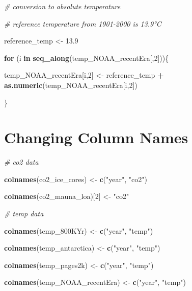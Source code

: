 \documentclass[
]{article}
\newenvironment{Shaded}{\begin{snugshade}}{\end{snugshade}}
\newcommand{\CommentTok}[1]{\textcolor[rgb]{0.56,0.35,0.01}{\textit{#1}}}
\newcommand{\ControlFlowTok}[1]{\textcolor[rgb]{0.13,0.29,0.53}{\textbf{#1}}}
\newcommand{\DecValTok}[1]{\textcolor[rgb]{0.00,0.00,0.81}{#1}}
\newcommand{\FloatTok}[1]{\textcolor[rgb]{0.00,0.00,0.81}{#1}}
\newcommand{\FunctionTok}[1]{\textcolor[rgb]{0.13,0.29,0.53}{\textbf{#1}}}
\newcommand{\NormalTok}[1]{#1}
\newcommand{\OtherTok}[1]{\textcolor[rgb]{0.56,0.35,0.01}{#1}}
\newcommand{\SpecialCharTok}[1]{\textcolor[rgb]{0.81,0.36,0.00}{\textbf{#1}}}
\newcommand{\StringTok}[1]{\textcolor[rgb]{0.31,0.60,0.02}{#1}}
\begin{document}
\begin{Shaded}
\begin{Highlighting}[]
\CommentTok{\# conversion to absolute temperature}

\CommentTok{\# reference temperature from 1901{-}2000 is 13.9°C}

\NormalTok{reference\_temp }\OtherTok{\textless{}{-}} \FloatTok{13.9}

\ControlFlowTok{for}\NormalTok{ (i }\ControlFlowTok{in} \FunctionTok{seq\_along}\NormalTok{(temp\_NOAA\_recentEra[,}\DecValTok{2}\NormalTok{]))\{}
 
\NormalTok{    temp\_NOAA\_recentEra[i,}\DecValTok{2}\NormalTok{] }\OtherTok{\textless{}{-}}\NormalTok{ reference\_temp }\SpecialCharTok{+} \FunctionTok{as.numeric}\NormalTok{(temp\_NOAA\_recentEra[i,}\DecValTok{2}\NormalTok{])}
    
\NormalTok{\}}
\end{Highlighting}
\end{Shaded}

\hypertarget{changing-column-names}{%
\section{Changing Column Names}\label{changing-column-names}}

\begin{Shaded}
\begin{Highlighting}[]
\CommentTok{\# co2 data}

\FunctionTok{colnames}\NormalTok{(co2\_ice\_cores) }\OtherTok{\textless{}{-}} \FunctionTok{c}\NormalTok{(}\StringTok{"year"}\NormalTok{, }\StringTok{"co2"}\NormalTok{)}

\FunctionTok{colnames}\NormalTok{(co2\_mauna\_loa)[}\DecValTok{2}\NormalTok{] }\OtherTok{\textless{}{-}} \StringTok{"co2"}

\CommentTok{\# temp data}

\FunctionTok{colnames}\NormalTok{(temp\_800KYr) }\OtherTok{\textless{}{-}} \FunctionTok{c}\NormalTok{(}\StringTok{"year"}\NormalTok{, }\StringTok{"temp"}\NormalTok{)}

\FunctionTok{colnames}\NormalTok{(temp\_antarctica) }\OtherTok{\textless{}{-}} \FunctionTok{c}\NormalTok{(}\StringTok{"year"}\NormalTok{, }\StringTok{"temp"}\NormalTok{)}

\FunctionTok{colnames}\NormalTok{(temp\_pages2k) }\OtherTok{\textless{}{-}} \FunctionTok{c}\NormalTok{(}\StringTok{"year"}\NormalTok{, }\StringTok{"temp"}\NormalTok{)}

\FunctionTok{colnames}\NormalTok{(temp\_NOAA\_recentEra) }\OtherTok{\textless{}{-}} \FunctionTok{c}\NormalTok{(}\StringTok{"year"}\NormalTok{, }\StringTok{"temp"}\NormalTok{)}
\end{Highlighting}
\end{Shaded}
\end{document}
